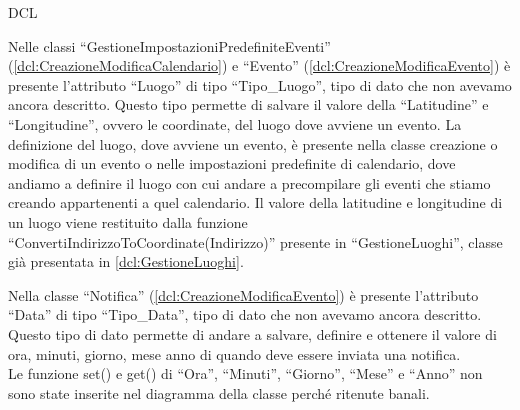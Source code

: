 \begin{listaPersonale}{DCL}
    \begin{center}
        
    \end{center}
    \newpage



    Nelle classi “GestioneImpostazioniPredefiniteEventi” (\ref{dcl:CreazioneModificaCalendario}) e “Evento” (\ref{dcl:CreazioneModificaEvento}) è presente l'attributo “Luogo” di tipo “Tipo\_Luogo”, tipo di dato che non avevamo ancora descritto. Questo tipo permette di salvare il valore della “Latitudine” e “Longitudine”, ovvero le coordinate, del luogo dove avviene un evento. La definizione del luogo, dove avviene un evento, è presente nella classe creazione o modifica di un evento o nelle impostazioni predefinite di calendario, dove andiamo a definire il luogo con cui andare a precompilare gli eventi che stiamo creando appartenenti a quel calendario. Il valore della latitudine e longitudine di un luogo viene restituito dalla funzione “ConvertiIndirizzoToCoordinate(Indirizzo)” presente in “GestioneLuoghi”, classe già presentata in \ref{dcl:GestioneLuoghi}.


    \begin{center}
        
    \end{center}




    Nella classe “Notifica” (\ref{dcl:CreazioneModificaEvento}) è presente l'attributo “Data” di tipo “Tipo\_Data”, tipo di dato che non avevamo ancora descritto. Questo tipo di dato permette di andare a salvare, definire e ottenere il valore di ora, minuti, giorno, mese anno di quando deve essere inviata una notifica. \\
    Le funzione set() e get() di “Ora”, “Minuti”, “Giorno”, “Mese” e “Anno” non sono state inserite nel diagramma della classe perché ritenute banali.



\end{listaPersonale}
